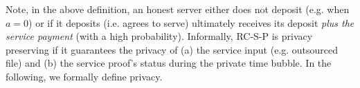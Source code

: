 % 
 Note, in the above definition, an honest server either does not deposit (e.g. when $a=0$) or if it deposits (i.e. agrees to serve) ultimately receives its deposit \emph{plus the service payment} (with a high probability). Informally, RC-S-P is privacy preserving if it guarantees the privacy of (a) the service input (e.g. outsourced file) and (b) the service proof's status during the private time bubble. In the following, we formally define privacy.
 

